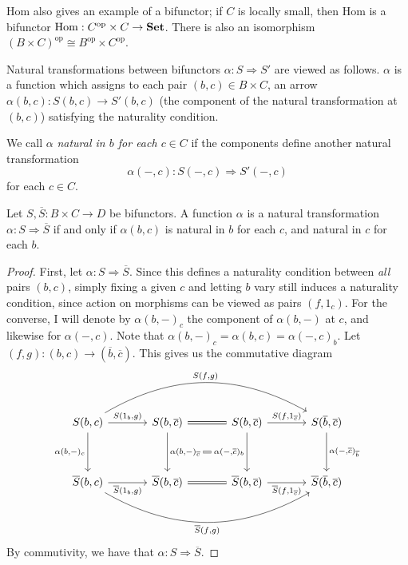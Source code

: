 Hom also gives an example of a bifunctor; if $C$ is locally small, then Hom is a bifunctor $\operatorname{Hom} : C^{\mathrm{op} } \times C \to \mathbf{Set} $. There is also an isomorphism $(B\times C)^{\mathrm{op} } \cong B^{\mathrm{op} } \times C^{\mathrm{op} } $.

Natural transformations between bifunctors $\alpha : S \Rightarrow S'$ are viewed as follows. $\alpha $ is a function which assigns to each pair $(b,c)\in B\times C$, an arrow $\alpha (b,c): S(b,c) \to S'(b,c)$ (the component of the natural transformation at $(b,c)$) satisfying the naturality condition.

We call $\alpha $ \emph{natural in $b$ for each $c\in C$}  if the components define another natural transformation
\[
	\alpha (-,c): S(-,c) \Rightarrow S'(-,c)
\]
for each $c\in C$.

\begin{proposition}\label{prp:2.2}
	Let $S,\overline{S} : B\times C \to D$ be bifunctors. A function $\alpha $ is a natural transformation $\alpha : S \Rightarrow \overline{S} $ if and only if $\alpha (b,c)$ is natural in $b$ for each $c$, and natural in $c$ for each $b$.
\end{proposition}
\begin{proof}
	First, let $\alpha : S \Rightarrow \overline{S} $. Since this defines a naturality condition between \emph{all} pairs $(b,c)$, simply fixing a given $c$ and letting $b$ vary still induces a naturality condition, since action on morphisms can be viewed as pairs $(f,1_c)$. For the converse, I will denote by $\alpha (b,-)_c$ the component of $\alpha (b,-)$ at $c$, and likewise for $\alpha (-,c)$. Note that $\alpha (b,-)_c=\alpha (b,c)=\alpha (-,c)_b$. Let $(f,g): (b,c) \to (\overline{b} ,\overline{c} )$. This gives us the commutative diagram
	\[\begin{tikzcd}[row sep = 3.5em, column sep = 3.5em]
		S(b,c)\ar[" S(1_b\text{,} g) ", r] \ar[" S(f\text{,} g) ", bend left, rrr] \ar[" \alpha (b\text{,} -)_c "', d]  & S(b,\overline{c} )\ar[equals, r] \ar[" \alpha (b\text{,} -)_{\overline{c} }  "{name=nt1}, d]  & S(b,\overline{c} )\ar[" \alpha (-\text{,} \overline{c} )_{b}  "'{name=nt2}, d] \ar[" S(f\text{,} 1_{\overline{c} } ) ", r]  & S(\overline{b} ,\overline{c} )\ar[" \alpha (-\text{,} \overline{c} )_{\overline{b} }  ", d]  \\
	\overline{S} (b,c)\ar[" \overline{S} (1_b\text{,} g) "', r] \ar[" \overline{S} (f\text{,} g) "', bend right, rrr]  & \overline{S} (b,\overline{c} )\ar[equals, r]  & \overline{S}(b,\overline{c} )\ar[" \overline{S} (f\text{,} 1_{\overline{c} } ) "', r]  & \overline{S} (\overline{b} ,\overline{c} )
	\arrow[from=nt1, to=nt2, equals]
	\end{tikzcd}\]
	By commutivity, we have that $\alpha : S \Rightarrow \overline{S} $.
\end{proof}

